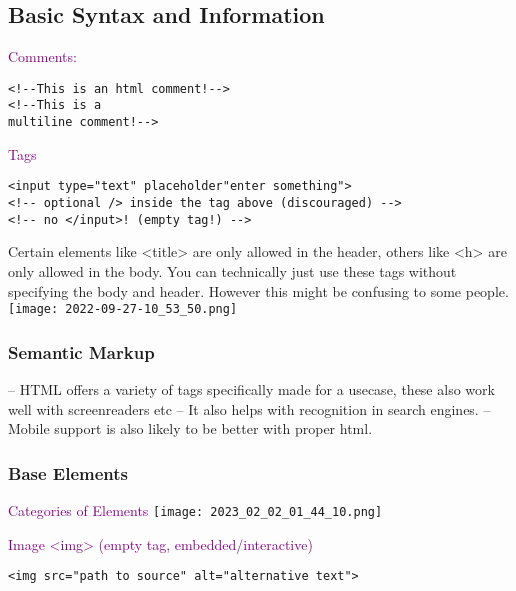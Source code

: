 \documentclass[main.tex,fontsize=6pt,paper=a4,paper=landscape,DIV=calc,]{scrartcl}
\begin{document}
\begin{multicols*}{4}
\subsection{Basic Syntax and Information}
\textcolor{purple}{Comments:}
\vspace{-2mm}
\begin{lstlisting}
<!--This is an html comment!-->
<!--This is a 
multiline comment!-->
\end{lstlisting}
\vspace{2mm}

\textcolor{purple}{Tags}
\vspace{-2mm}
\begin{lstlisting}
<input type="text" placeholder"enter something">
<!-- optional /> inside the tag above (discouraged) -->
<!-- no </input>! (empty tag!) -->
\end{lstlisting}
\vspace{2mm}
Certain elements like <title> are only allowed in the header, others like <h> are only allowed in the body.\newline
You can technically just use these tags without specifying the body and header.\newline
However this might be confusing to some people.
\texttt{[image: 2022-09-27-10\_53\_50.png]}


\subsubsection{Semantic Markup}
-- HTML offers a variety of tags specifically made for a usecase, these also work well with screenreaders etc\newline
-- It also helps with recognition in search engines.\newline
-- Mobile support is also likely to be better with proper html.



\subsubsection{Base Elements}
\textcolor{purple}{Categories of Elements}
\texttt{[image: 2023\_02\_02\_01\_44\_10.png]}

\textcolor{purple}{Image <img> (empty tag, embedded/interactive)}
\vspace{-2mm}
\begin{lstlisting}
<img src="path to source" alt="alternative text">
\end{lstlisting}
\vspace{2mm}


\end{multicols*}
\end{document}
